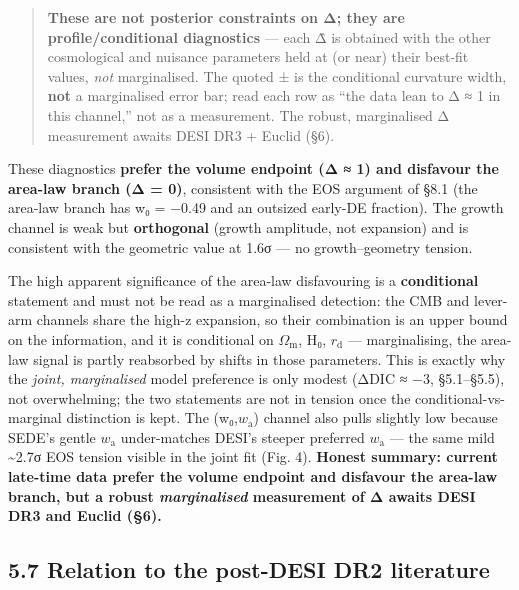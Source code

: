 \documentclass[
  10pt,
]{article}
\begin{document}
\begin{quote}
\textbf{These are not posterior constraints on Δ; they are
profile/conditional diagnostics} --- each Δ̂ is obtained with the other
cosmological and nuisance parameters held at (or near) their best-fit
values, \emph{not} marginalised. The quoted ± is the conditional
curvature width, \textbf{not} a marginalised error bar; read each row as
``the data lean to Δ ≈ 1 in this channel,'' not as a measurement. The
robust, marginalised Δ measurement awaits DESI DR3 + Euclid (§6).
\end{quote}

These diagnostics \textbf{prefer the volume endpoint (Δ ≈ 1) and
disfavour the area-law branch (Δ = 0)}, consistent with the EOS argument
of §8.1 (the area-law branch has w₀ = −0.49 and an outsized early-DE
fraction). The growth channel is weak but \textbf{orthogonal} (growth
amplitude, not expansion) and is consistent with the geometric value at
1.6σ --- no growth--geometry tension.

The high apparent significance of the area-law disfavouring is a
\textbf{conditional} statement and must not be read as a marginalised
detection: the CMB and lever-arm channels share the high-z expansion, so
their combination is an upper bound on the information, and it is
conditional on \(\Omega _{\mathrm{m}}\), H₀, \(r_{\mathrm{d}}\) ---
marginalising, the area-law signal is partly reabsorbed by shifts in
those parameters. This is exactly why the \emph{joint, marginalised}
model preference is only modest (ΔDIC ≈ −3, §5.1--§5.5), not
overwhelming; the two statements are not in tension once the
conditional-vs-marginal distinction is kept. The (w₀,\(w_{\mathrm{a}}\))
channel also pulls slightly low because SEDE's gentle \(w_{\mathrm{a}}\)
under-matches DESI's steeper preferred \(w_{\mathrm{a}}\) --- the same
mild \textasciitilde2.7σ EOS tension visible in the joint fit (Fig. 4).
\textbf{Honest summary: current late-time data prefer the volume
endpoint and disfavour the area-law branch, but a robust
\emph{marginalised} measurement of Δ awaits DESI DR3 and Euclid (§6).}

\subsection{5.7 Relation to the post-DESI DR2
literature}\label{relation-to-the-post-desi-dr2-literature}
\end{document}
